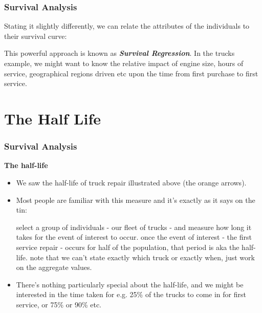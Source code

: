 \documentclass[]{beamer}
\begin{document}
	\begin{frame}
		\frametitle{Survival Analysis}
		Stating it slightly differently, we can relate the attributes of the individuals to their survival curve:
		
		
		This powerful approach is known as \textbf{\textit{Survival Regression}}. In the trucks example, we might want to know the relative impact of engine size, hours of service, geographical regions driven etc upon the time from first purchase to first service.
	\end{frame}
	\section{The Half Life}
	\begin{frame}
		\frametitle{Survival Analysis}
		\noindent \textbf{The half-life}
		\begin{itemize}
			\item We saw the half-life of truck repair illustrated above (the orange arrows). 
			\item Most people are familiar with this measure and it's exactly as it says on the tin:
			
			select a group of individuals - our fleet of trucks - and measure how long it takes for the event of interest to occur.
			once the event of interest - the first service repair - occurs for half of the population, that period is aka the half-life.
			note that we can't state exactly which truck or exactly when, just work on the aggregate values.
			\item There's nothing particularly special about the half-life, and we might be interested in the time taken for e.g. 25\% of the trucks to come in for first service, or 75\% or 90\% etc.
		\end{itemize}
		
	\end{frame}
\end{document}
